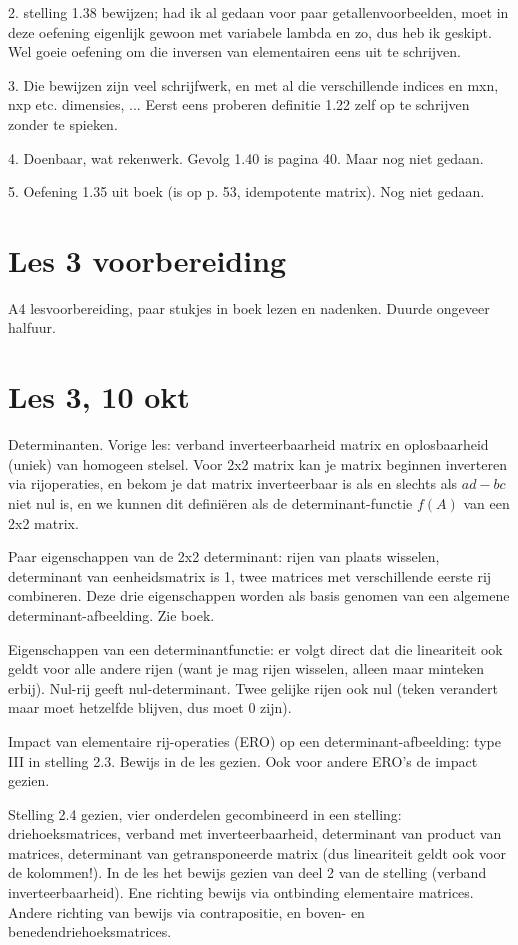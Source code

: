 \documentclass{article}
\begin{document}
2. stelling 1.38 bewijzen; had ik al gedaan voor paar getallenvoorbeelden, moet in deze oefening eigenlijk gewoon met variabele lambda en zo, dus heb ik geskipt. Wel goeie oefening om die inversen van elementairen eens uit te schrijven. 

3. Die bewijzen zijn veel schrijfwerk, en met al die verschillende indices en mxn, nxp etc. dimensies, ... Eerst eens proberen definitie 1.22 zelf op te schrijven zonder te spieken. 

4. Doenbaar, wat rekenwerk. Gevolg 1.40 is pagina 40. Maar nog niet gedaan. 

5. Oefening 1.35 uit boek (is op p. 53, idempotente matrix). Nog niet gedaan. 

\section{Les 3 voorbereiding}

A4 lesvoorbereiding, paar stukjes in boek lezen en nadenken. Duurde ongeveer halfuur. 

\section{Les 3, 10 okt}

Determinanten. Vorige les: verband inverteerbaarheid matrix en oplosbaarheid (uniek) van homogeen stelsel. Voor 2x2 matrix kan je matrix beginnen inverteren via rijoperaties, en bekom je dat matrix inverteerbaar is als en slechts als $ad-bc$ niet nul is, en we kunnen dit defini\"eren als de determinant-functie $f(A)$ van een 2x2 matrix. 

Paar eigenschappen van de 2x2 determinant: rijen van plaats wisselen, determinant van eenheidsmatrix is 1, twee matrices met verschillende eerste rij combineren. Deze drie eigenschappen worden als basis genomen van een algemene determinant-afbeelding. Zie boek. 

Eigenschappen van een determinantfunctie: er volgt direct dat die lineariteit ook geldt voor alle andere rijen (want je mag rijen wisselen, alleen maar minteken erbij). Nul-rij geeft nul-determinant. Twee gelijke rijen ook nul (teken verandert maar moet hetzelfde blijven, dus moet 0 zijn). 

Impact van elementaire rij-operaties (ERO) op een determinant-afbeelding: type III in stelling 2.3. Bewijs in de les gezien. Ook voor andere ERO's de impact gezien. 

Stelling 2.4 gezien, vier onderdelen gecombineerd in een stelling: driehoeksmatrices, verband met inverteerbaarheid, determinant van product van matrices, determinant van getransponeerde matrix (dus lineariteit geldt ook voor de kolommen!). In de les het bewijs gezien van deel 2 van de stelling (verband inverteerbaarheid). Ene richting bewijs via ontbinding elementaire matrices. Andere richting van bewijs via contrapositie, en boven- en benedendriehoeksmatrices. 
\end{document}
